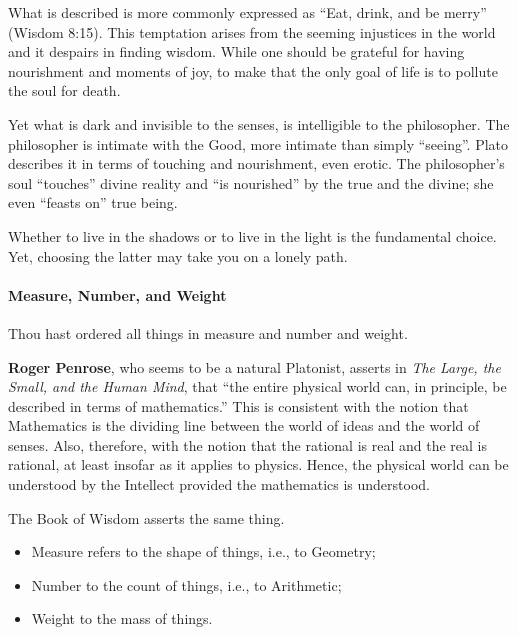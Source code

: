 What is described is more commonly expressed as ``Eat, drink, and be merry'' (Wisdom 8:15). This temptation arises from the seeming injustices in the world and it despairs in finding wisdom. While one should be grateful for having nourishment and moments of joy, to make that the only goal of life is to pollute the soul for death.

Yet what is dark and invisible to the senses, is intelligible to the philosopher. The philosopher is intimate with the Good, more intimate than simply ``seeing''. Plato describes it in terms of touching and nourishment, even erotic. The philosopher's soul ``touches'' divine reality and ``is nourished'' by the true and the divine; she even ``feasts on'' true being.

Whether to live in the shadows or to live in the light is the fundamental choice. Yet, choosing the latter may take you on a lonely path.

\paragraph{Measure, Number, and Weight}


\begin{quotex}
Thou hast ordered all things in measure and number and weight.
\end{quotex}


\textbf{Roger Penrose}, who seems to be a natural Platonist, asserts in \textit{The Large, the Small, and the Human Mind}, that ``the entire physical world can, in principle, be described in terms of mathematics.'' This is consistent with the notion that Mathematics is the dividing line between the world of ideas and the world of senses. Also, therefore, with the notion that the rational is real and the real is rational, at least insofar as it applies to physics. Hence, the physical world can be understood by the Intellect provided the mathematics is understood.

The Book of Wisdom asserts the same thing.

\begin{itemize}


\item Measure refers to the shape of things, i.e., to Geometry;

\item Number to the count of things, i.e., to Arithmetic;

\item Weight to the mass of things.
\end{itemize}


